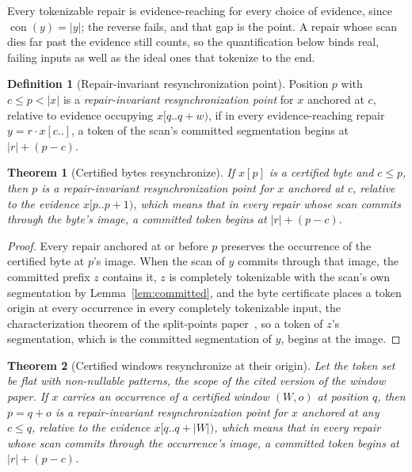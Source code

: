 \documentclass[11pt,a4paper]{article}
\theoremstyle{definition}
\newtheorem{definition}{Definition}
\theoremstyle{plain}
\newtheorem{theorem}{Theorem}
\theoremstyle{remark}
\newcommand{\suffix}[2]{#1[#2..]}
\newcommand{\window}[3]{#1[#2..#3)}
\newcommand{\con}{\operatorname{con}}
\begin{document}
Every tokenizable repair is evidence-reaching for every choice of evidence, since $\con(y) = |y|$; the reverse fails,
and that gap is the point. A repair whose scan dies far past the evidence still counts, so the quantification below
binds real, failing inputs as well as the ideal ones that tokenize to the end.

\begin{definition}[Repair-invariant resynchronization point]
Position $p$ with $c \le p < |x|$ is a \emph{repair-invariant resynchronization point} for $x$ anchored at $c$, relative
to evidence occupying $\window{x}{q}{q+w}$, if in every evidence-reaching repair $y = r \cdot \suffix{x}{c}$, a token of
the scan's committed segmentation begins at $|r| + (p - c)$.
\end{definition}

\begin{theorem}[Certified bytes resynchronize]
If $x[p]$ is a certified byte and $c \le p$, then $p$ is a repair-invariant resynchronization point for $x$ anchored at
$c$, relative to the evidence $\window{x}{p}{p+1}$, which means that in every repair whose scan commits through the
byte's image, a committed token begins at $|r| + (p - c)$.
\end{theorem}

\begin{proof}
Every repair anchored at or before $p$ preserves the occurrence of the certified byte at $p$'s image. When the scan of
$y$ commits through that image, the committed prefix $z$ contains it, $z$ is completely tokenizable with the scan's own
segmentation by Lemma~\ref{lem:committed}, and the byte certificate places a token origin at every occurrence in every
completely tokenizable input, the characterization theorem of the split-points paper~\citep[Theorem~2, arXiv
v2]{splitpoints2026}, so a token of $z$'s segmentation, which is the committed segmentation of $y$, begins at the image.
\end{proof}

\begin{theorem}[Certified windows resynchronize at their origin]
Let the token set be flat with non-nullable patterns, the scope of the cited version of the window paper. If $x$ carries
an occurrence of a certified window $(W, o)$ at position $q$, then $p = q + o$ is a repair-invariant resynchronization
point for $x$ anchored at any $c \le q$, relative to the evidence $\window{x}{q}{q+|W|}$, which means that in every
repair whose scan commits through the occurrence's image, a committed token begins at $|r| + (p - c)$.
\end{theorem}
\end{document}
